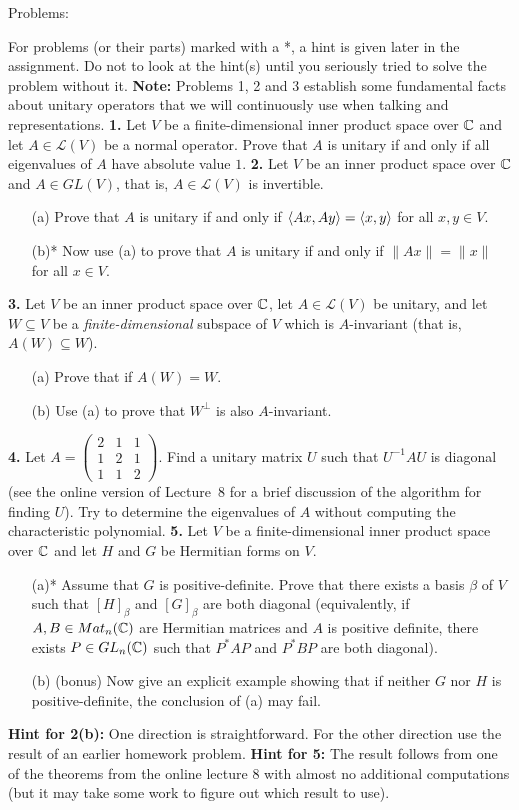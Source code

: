 \documentclass[12pt]{amsart}
\begin{document}
\bf\centerline{Problems: }\rm
\skv
For problems (or their parts) marked with a *, a hint is given later in the assignment. Do not to look at the hint(s) until you seriously tried to solve the problem without it.
\skv
{\bf Note:} Problems 1, 2 and 3 establish some fundamental facts about unitary operators that we will continuously use when talking and representations.
\skv
{\bf 1.} Let $V$ be a finite-dimensional inner product space over ${\mathbb C}$ and let $A\in \mathcal L(V)$ be a normal operator. Prove that $A$ is unitary if and only if all eigenvalues of $A$ have absolute value $1$.
\skv
{\bf 2.} Let $V$ be an inner product space over ${\mathbb C}$ and $A\in GL(V)$, that is, $A\in \mathcal L(V)$ is invertible. 
\begin{itemize}
\item[(a)] Prove that $A$ is unitary if and only if ${\langle} Ax,Ay{\rangle}={\langle} x,y{\rangle}$ for all $x,y\in V$.
\item[(b)*] Now use (a) to prove that $A$ is unitary if and only if $\|Ax\|=\|x\|$ for all $x\in V$.
\end{itemize}
\skv
{\bf 3.} Let $V$ be an inner product space over ${\mathbb C}$, let $A\in \mathcal L(V)$ be unitary, and let $W\subseteq V$ be a {\it finite-dimensional} subspace of $V$ which is  $A$-invariant (that is, $A(W)\subseteq W$).
 \begin{itemize}
\item[(a)] Prove that if $A(W)=W$.
\item[(b)] Use (a) to prove that $W^{\perp}$ is also $A$-invariant.
\end{itemize}
\skv
{\bf 4.} Let $A=\begin{pmatrix}2&1&1\\1&2&1\\1&1&2\end{pmatrix}$. Find a unitary matrix $U$ such that $U^{-1}AU$ is diagonal (see the online version of Lecture~8 for a brief discussion of the algorithm for finding $U$). Try to determine the eigenvalues of $A$ without computing the characteristic polynomial.
\skv
{\bf 5.} Let $V$ be a finite-dimensional inner product space over ${\mathbb C}$ and let $H$ and $G$ be Hermitian forms on $V$.
 \begin{itemize}
\item[(a)*] Assume that $G$ is positive-definite. Prove that there exists a basis $\beta$ of $V$ such that $[H]_{\beta}$ and $[G]_{\beta}$ are both diagonal (equivalently, if $A,B\in Mat_n({\mathbb C})$ are Hermitian matrices and $A$ is positive definite, there exists $P\in GL_n({\mathbb C})$ such that
$P^*AP$ and $P^*BP$ are both diagonal).
\item[(b)] (bonus) Now give an explicit example showing that if neither $G$ nor $H$ is positive-definite, the conclusion of (a) may fail.
\end{itemize}
\newpage
{\bf Hint for 2(b):} One direction is straightforward. For the other direction use the result of an earlier homework problem.
\newpage
{\bf Hint for 5:} The result follows from one of the theorems from the online lecture 8 with almost no additional computations (but it may take some work to figure out which result to use).
\end{document}
